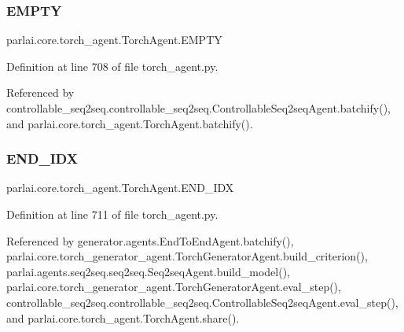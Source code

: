 \mbox{\label{classparlai_1_1core_1_1torch__agent_1_1TorchAgent_a3a80083f0e34d8abc15b50123efec884}} 
\subsubsection{\texorpdfstring{E\+M\+P\+TY}{EMPTY}}
{\footnotesize\ttfamily parlai.\+core.\+torch\+\_\+agent.\+Torch\+Agent.\+E\+M\+P\+TY}



Definition at line 708 of file torch\+\_\+agent.\+py.



Referenced by controllable\+\_\+seq2seq.\+controllable\+\_\+seq2seq.\+Controllable\+Seq2seq\+Agent.\+batchify(), and parlai.\+core.\+torch\+\_\+agent.\+Torch\+Agent.\+batchify().

\mbox{\label{classparlai_1_1core_1_1torch__agent_1_1TorchAgent_a31bb7c8bf380660ee4e3822756563599}} 
\subsubsection{\texorpdfstring{E\+N\+D\+\_\+\+I\+DX}{END\_IDX}}
{\footnotesize\ttfamily parlai.\+core.\+torch\+\_\+agent.\+Torch\+Agent.\+E\+N\+D\+\_\+\+I\+DX}



Definition at line 711 of file torch\+\_\+agent.\+py.



Referenced by generator.\+agents.\+End\+To\+End\+Agent.\+batchify(), parlai.\+core.\+torch\+\_\+generator\+\_\+agent.\+Torch\+Generator\+Agent.\+build\+\_\+criterion(), parlai.\+agents.\+seq2seq.\+seq2seq.\+Seq2seq\+Agent.\+build\+\_\+model(), parlai.\+core.\+torch\+\_\+generator\+\_\+agent.\+Torch\+Generator\+Agent.\+eval\+\_\+step(), controllable\+\_\+seq2seq.\+controllable\+\_\+seq2seq.\+Controllable\+Seq2seq\+Agent.\+eval\+\_\+step(), and parlai.\+core.\+torch\+\_\+agent.\+Torch\+Agent.\+share().

